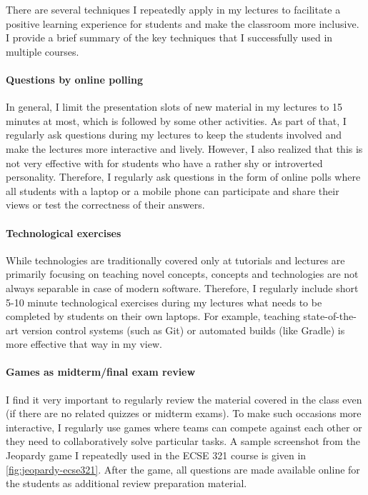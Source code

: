 \documentclass[a4paper,11pt]{report}
\begin{document}
There are several techniques I repeatedly apply in my lectures to facilitate a positive learning experience for students and 
make the classroom more inclusive. I provide a brief summary of the key techniques that I successfully used in multiple 
courses. 

\paragraph{Questions by online polling}
In general, I limit the presentation slots of new material in my lectures to 15 minutes at most, which is followed by some 
other activities. As part of that, I regularly ask questions during my lectures to keep the students involved and make the 
lectures more interactive and lively. However, I also realized that this is not very effective with for students who have a 
rather shy or introverted personality. Therefore, I regularly ask questions in the form of online polls where all students with 
a laptop or a mobile phone can participate and share their views or test the correctness of their answers. 

\paragraph{Technological exercises}
While technologies are traditionally covered only at tutorials and lectures are primarily focusing on teaching novel concepts, concepts and technologies are not always separable in case of modern software. Therefore, I regularly include short 5-10 minute technological exercises during my lectures what needs to be completed by students on their own laptops. For example, teaching state-of-the-art version control systems (such as Git) or automated builds (like Gradle) is more effective that way in my view. 

\paragraph{Games as midterm/final exam review}
I find it very important to regularly review the material covered in the class even (if there are no related quizzes or midterm exams). To make such occasions more interactive, I regularly use games where teams can compete against each other or they need to collaboratively solve particular tasks. A sample screenshot from the Jeopardy game I repeatedly used in the ECSE 321 course is given in \autoref{fig:jeopardy-ecse321}. After the game, all questions are made available online for the students as additional review preparation material.
\end{document}

